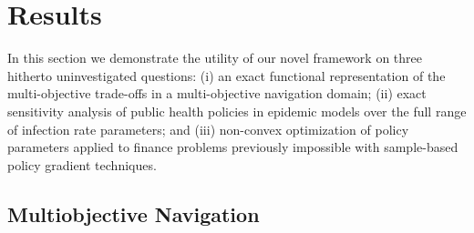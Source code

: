 \section{Results}
\label{sec:results}

In this section we demonstrate the utility of our novel framework on three hitherto uninvestigated questions: (i) an exact functional representation of the multi-objective trade-offs in a multi-objective navigation domain; (ii) exact sensitivity analysis of public health policies in epidemic models over the full range of infection rate parameters; and (iii) non-convex optimization of policy parameters applied to finance problems previously impossible with sample-based policy gradient techniques.

\subsection{Multiobjective Navigation}
\label{sec:autonomous_driving}


